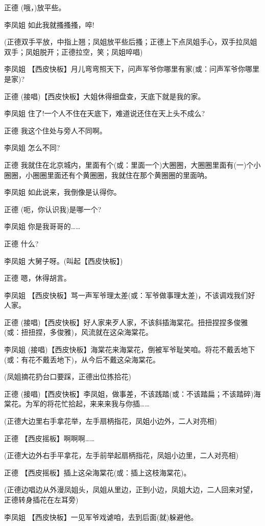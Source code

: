 正德 (哦，)放平些。

李凤姐 如此我就搔搔搔，啐!

(正德双手平放，中指上翘；凤姐放平些后搔；正德上下点凤姐手心，双手拉凤姐双手；凤姐脱开；正德拉空，笑；凤姐啐唱)

李凤姐
【西皮快板】月儿弯弯照天下，问声军爷你哪里有家(或：问声军爷你哪里是家)?

正德 (接唱)【西皮快板】大姐休得细盘查，天底下就是我的家。

李凤姐 住了!一个人不住在天底下，难道说还住在天上头不成么?

正德 我这个住处与旁人不同啊。

李凤姐 怎么不同?

正德
我就住在北京城内，里面有个(或：里面一个)大圈圈，大圈圈里面有(一)个小圈圈，小圈圈里面还有个黄圈圈，我就住在那个黄圈圈的里面呐。

李凤姐 如此说来，我倒像是认得你。

正德 (呃，你认识我)是哪一个?

李凤姐 你是我哥哥的\ldots{}\ldots{}

正德 什么?

李凤姐 大舅子呀。(叫起【西皮快板】)

正德 嗯，休得胡言。

李凤姐
【西皮快板】骂一声军爷理太差(或：军爷做事理太差)，不该调戏我们好人家。

正德
(接唱)【西皮快板】好人家来歹人家，不该斜插海棠花。扭扭捏捏多俊雅(或：扭扭捏，多俊雅)，风流就在这朵海棠花。

李凤姐
(接唱)【西皮快板】海棠花来海棠花，倒被军爷耻笑咱。将花不戴丢地下(或：有花不戴丢地下)，从今后不戴这朵海棠花。

(凤姐摘花扔台口要踩，正德出位拣拾花)

正德
(接唱)【西皮快板】李凤姐，做事差，不该践踏(或：不该踏扁；不该踏碎)海棠花。为军的将花忙拾起，来来来我与你插\ldots{}\ldots{}

(正德大边里右手拿花举，左手扇柄指花，凤姐小边外，二人对亮相)

正德 【西皮摇板】啊啊啊\ldots{}\ldots{}

(正德大边外右手平拿花，左手前举起扇柄指花，凤姐小边里，二人对亮相)

正德 【西皮摇板】插上这朵海棠花(或：插上这枝海棠花)。

(正德边唱边从外漫凤姐头，凤姐从里边，正到小边，凤姐大边，二人回来对望，正德转身插花在左耳旁)

李凤姐 【西皮快板】一见军爷戏谑咱，去到后面(就)躲避他。

